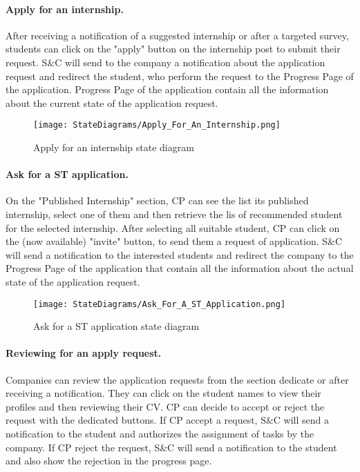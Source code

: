 \paragraph{Apply for an internship.}
After receiving a notification of a suggested internship or after a targeted survey, students can click on the "apply" button on the internship post to submit their request.
S\&C will send to the company a notification about the application request and redirect the student, who perform the request to the Progress Page of the application.
Progress Page of the application contain all the information about the current state of the application request.

\begin{figure}[H]
    \begin{center}
        \texttt{[image: StateDiagrams/Apply\_For\_An\_Internship.png]}
        \caption{Apply for an internship state diagram}
        \label{fig:apply_for_an_internship_sd}%
    \end{center}
\end{figure}

\paragraph{Ask for a ST application.}
On the "Published Internship" section, CP can see the list its published internship, select one of them and then retrieve the lis of recommended student for the selected internship. After selecting all suitable student, CP can click on the (now available) "invite" button, to send them a request of application.
S\&C will send a notification to the interested students and redirect the company to the Progress Page of the application that contain all the information about the actual state of the application request.

\begin{figure}[H]
    \begin{center}
        \texttt{[image: StateDiagrams/Ask\_For\_A\_ST\_Application.png]}
        \caption{Ask for a ST application state diagram}
        \label{fig:ask_for_a_ST_application_sd}%
    \end{center}
\end{figure}

\paragraph{Reviewing for an apply request.}
Companies can review the application requests from the section dedicate or after receiving a notification. They can click on the student names to view their profiles and then reviewing their CV.
CP can decide to accept or reject the request with the dedicated buttons. 
If CP accept a request, S\&C will send a notification to the student and authorizes the assignment of tasks by the company.
If CP reject the request, S\&C will send a notification to the student and also show the rejection in the progress page.

